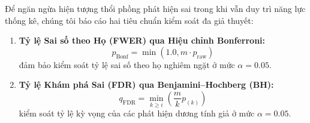 \documentclass[10pt,twocolumn,letterpaper]{article}
\begin{document}
Để ngăn ngừa hiện tượng thổi phồng phát hiện sai trong khi vẫn duy trì năng lực thống kê, chúng tôi báo cáo hai tiêu chuẩn kiểm soát đa giả thuyết:
\begin{enumerate}
    \item \textbf{Tỷ lệ Sai số theo Họ (FWER) qua Hiệu chỉnh Bonferroni:}
    \begin{equation}
        p_{\mathrm{Bonf}} = \min(1.0, m \cdot p_{\mathrm{raw}})
    \end{equation}
    đảm bảo kiểm soát tỷ lệ sai số theo họ nghiêm ngặt ở mức $\alpha = 0.05$.
    \item \textbf{Tỷ lệ Khám phá Sai (FDR) qua Benjamini--Hochberg (BH):}
    \begin{equation}
        q_{\mathrm{FDR}} = \min_{k \ge i} \left(\frac{m}{k} p_{(k)}\right)
    \end{equation}
    kiểm soát tỷ lệ kỳ vọng của các phát hiện dương tính giả ở mức $\alpha = 0.05$.
\end{enumerate}
\end{document}
